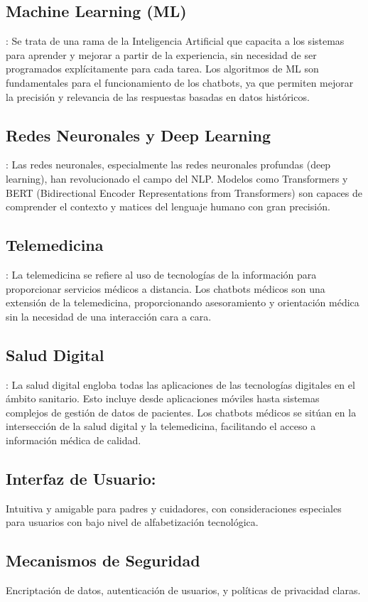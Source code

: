 \subsection{Machine Learning (ML)}: Se trata de una rama de la Inteligencia Artificial que capacita a los sistemas para aprender y mejorar a partir de la experiencia, sin necesidad de ser programados explícitamente para cada tarea. Los algoritmos de ML son fundamentales para el funcionamiento de los chatbots, ya que permiten mejorar la precisión y relevancia de las respuestas basadas en datos históricos.

\subsection{Redes Neuronales y Deep Learning}: Las redes neuronales, especialmente las redes neuronales profundas (deep learning), han revolucionado el campo del NLP. Modelos como Transformers y BERT (Bidirectional Encoder Representations from Transformers) son capaces de comprender el contexto y matices del lenguaje humano con gran precisión.

\subsection{Telemedicina}: La telemedicina se refiere al uso de tecnologías de la información para proporcionar servicios médicos a distancia. Los chatbots médicos son una extensión de la telemedicina, proporcionando asesoramiento y orientación médica sin la necesidad de una interacción cara a cara.


\subsection{Salud Digital}: La salud digital engloba todas las aplicaciones de las tecnologías digitales en el ámbito sanitario. Esto incluye desde aplicaciones móviles hasta sistemas complejos de gestión de datos de pacientes. Los chatbots médicos se sitúan en la intersección de la salud digital y la telemedicina, facilitando el acceso a información médica de calidad.

\subsection{Interfaz de Usuario: } Intuitiva y amigable para padres y cuidadores, con consideraciones especiales para usuarios con bajo nivel de alfabetización tecnológica.


\subsection{Mecanismos de Seguridad} Encriptación de datos, autenticación de usuarios, y políticas de privacidad claras.